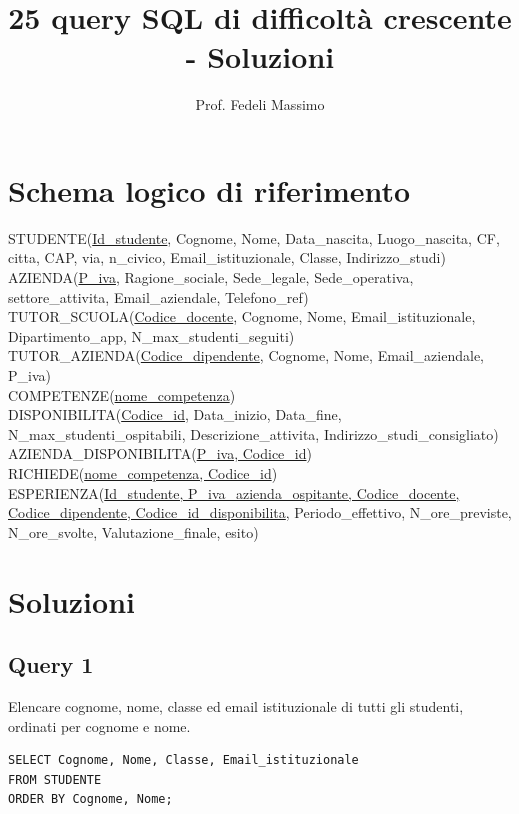 \documentclass[a4paper,12pt]{article}
\title{25 query SQL di difficoltà crescente - Soluzioni}
\author{Prof. Fedeli Massimo}
\date{}
\begin{document}
\maketitle

\section*{Schema logico di riferimento}

\begin{flushleft}
STUDENTE(\underline{Id\_studente}, Cognome, Nome, Data\_nascita, Luogo\_nascita, CF, citta, CAP, via, n\_civico, Email\_istituzionale, Classe, Indirizzo\_studi) \\
AZIENDA(\underline{P\_iva}, Ragione\_sociale, Sede\_legale, Sede\_operativa, settore\_attivita, Email\_aziendale, Telefono\_ref) \\
TUTOR\_SCUOLA(\underline{Codice\_docente}, Cognome, Nome, Email\_istituzionale, Dipartimento\_app, N\_max\_studenti\_seguiti) \\
TUTOR\_AZIENDA(\underline{Codice\_dipendente}, Cognome, Nome, Email\_aziendale, P\_iva) \\
COMPETENZE(\underline{nome\_competenza}) \\
DISPONIBILITA(\underline{Codice\_id}, Data\_inizio, Data\_fine, N\_max\_studenti\_ospitabili, Descrizione\_attivita, Indirizzo\_studi\_consigliato) \\
AZIENDA\_DISPONIBILITA(\underline{P\_iva, Codice\_id}) \\
RICHIEDE(\underline{nome\_competenza, Codice\_id}) \\
ESPERIENZA(\underline{Id\_studente, P\_iva\_azienda\_ospitante, Codice\_docente, Codice\_dipendente, Codice\_id\_disponibilita}, Periodo\_effettivo, N\_ore\_previste, N\_ore\_svolte, Valutazione\_finale, esito)
\end{flushleft}


\section*{Soluzioni}\subsection*{Query 1}Elencare cognome, nome, classe ed email istituzionale di tutti gli studenti, ordinati per cognome e nome.
\begin{lstlisting}
SELECT Cognome, Nome, Classe, Email_istituzionale
FROM STUDENTE
ORDER BY Cognome, Nome;
\end{lstlisting}
\end{document}
